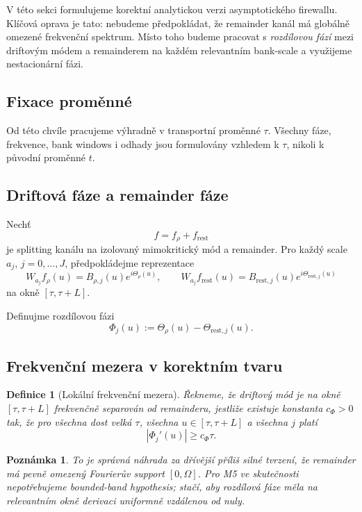 \documentclass[11pt,a4paper]{article}
\newtheorem{definition}[theorem]{Definice}
\newtheorem{remark}[theorem]{Poznámka}
\begin{document}
V této sekci formulujeme korektní analytickou verzi asymptotického firewallu.
Klíčová oprava je tato:
nebudeme předpokládat, že remainder kanál má globálně omezené frekvenční spektrum.
Místo toho budeme pracovat s \emph{rozdílovou fází} mezi driftovým módem a remainderem
na každém relevantním bank-scale a využijeme nestacionární fázi.

\subsection*{Fixace proměnné}

Od této chvíle pracujeme výhradně v transportní proměnné \(\tau\).
Všechny fáze, frekvence, bank windows i odhady jsou formulovány vzhledem k \(\tau\),
nikoli k původní proměnné \(t\).

\subsection*{Driftová fáze a remainder fáze}

Nechť
\[
f=f_\rho+f_{\mathrm{rest}}
\]
je splitting kanálu na izolovaný mimokritický mód a remainder.
Pro každý scale \(a_j\), \(j=0,\dots,J\), předpokládejme reprezentace
\[
W_{a_j}f_\rho(u)=B_{\rho,j}(u)e^{i\Theta_\rho(u)},
\qquad
W_{a_j}f_{\mathrm{rest}}(u)=B_{\mathrm{rest},j}(u)e^{i\Theta_{\mathrm{rest},j}(u)}
\]
na okně \([\tau,\tau+L]\).

Definujme rozdílovou fázi
\[
\Phi_j(u):=\Theta_\rho(u)-\Theta_{\mathrm{rest},j}(u).
\]

\subsection*{Frekvenční mezera v korektním tvaru}

\begin{definition}[Lokální frekvenční mezera]
Řekneme, že driftový mód je na okně \([\tau,\tau+L]\) frekvenčně separován od remainderu,
jestliže existuje konstanta \(c_\Phi>0\) tak, že pro všechna dost velká \(\tau\),
všechna \(u\in[\tau,\tau+L]\) a všechna \(j\) platí
\[
|\Phi_j'(u)|\ge c_\Phi \tau.
\]
\end{definition}

\begin{remark}
To je správná náhrada za dřívější příliš silné tvrzení, že remainder má pevně omezený
Fourierův support \([0,\Omega]\). Pro M5 ve skutečnosti nepotřebujeme bounded-band hypothesis;
stačí, aby rozdílová fáze měla na relevantním okně derivaci uniformně vzdálenou od nuly.
\end{remark}
\end{document}
